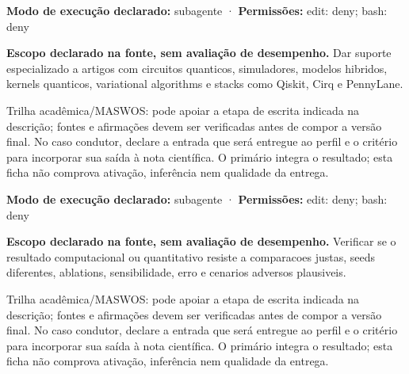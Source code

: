 \begin{arquitetura}
\textbf{Modo de execução declarado:} subagente · \textbf{Permissões:} edit: deny; bash: deny
\end{arquitetura}


\begin{descricao}
\textbf{Escopo declarado na fonte, sem avaliação de desempenho.}
Dar suporte especializado a artigos com circuitos quanticos, simuladores, modelos hibridos, kernels quanticos, variational algorithms e stacks como Qiskit, Cirq e PennyLane.
\end{descricao}

\begin{funcao}
Trilha acadêmica/MASWOS: pode apoiar a etapa de escrita indicada na descrição; fontes e afirmações devem ser verificadas antes de compor a versão final. No caso condutor, declare a entrada que será entregue ao perfil e o critério para incorporar sua saída à nota científica. O primário integra o resultado; esta ficha não comprova ativação, inferência nem qualidade da entrega.
\end{funcao}

\begin{arquitetura}
\textbf{Modo de execução declarado:} subagente · \textbf{Permissões:} edit: deny; bash: deny
\end{arquitetura}


\begin{descricao}
\textbf{Escopo declarado na fonte, sem avaliação de desempenho.}
Verificar se o resultado computacional ou quantitativo resiste a comparacoes justas, seeds diferentes, ablations, sensibilidade, erro e cenarios adversos plausiveis.
\end{descricao}

\begin{funcao}
Trilha acadêmica/MASWOS: pode apoiar a etapa de escrita indicada na descrição; fontes e afirmações devem ser verificadas antes de compor a versão final. No caso condutor, declare a entrada que será entregue ao perfil e o critério para incorporar sua saída à nota científica. O primário integra o resultado; esta ficha não comprova ativação, inferência nem qualidade da entrega.
\end{funcao}


